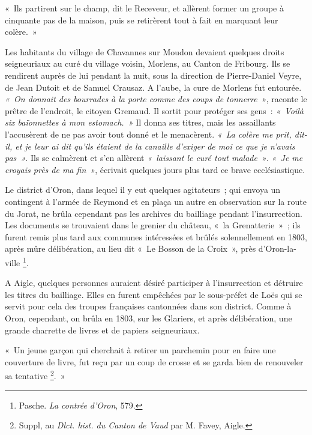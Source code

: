 \documentclass[french,twoside]{book} %
\newenvironment{quoteblock}%
  {\begin{quoting}}
  {\end{quoting}}
\newenvironment{quotebar}{%
    \def\FrameCommand{{\color{rubric!10!}\vrule width 0.5em} \hspace{0.9em}}%
    \def\OuterFrameSep{\itemsep} %
    \MakeFramed {\advance\hsize-\width \FrameRestore}
  }%
  {%
    \endMakeFramed
  }
\renewenvironment{quoteblock}%
  {%
    \savenotes
    \setstretch{0.9}
    \normalfont
    \begin{quotebar}
  }
  {%
    \end{quotebar}
    \spewnotes
  }
\begin{document}
\begin{quoteblock}
\noindent « Ils partirent sur le champ, dit le Receveur, et allèrent former un groupe à cinquante pas de la maison, puis se retirèrent tout à fait en marquant leur colère. »\end{quoteblock}

\noindent Les habitants du village de Chavannes sur Moudon devaient quelques droits seigneuriaux au curé du village voisin, Morlens, au Canton de Fribourg. Ils se rendirent auprès de lui pendant la nuit, sous la direction de Pierre-Daniel Veyre, de Jean Dutoit et de Samuel Crausaz. A l’aube, la cure de Morlens fut entourée. \emph{« On donnait des bourrades à la porte comme des coups de tonnerre »}, raconte le prêtre de l’endroit, le citoyen Gremaud. Il sortit pour protéger ses gens : \emph{« Voilà six baïonnettes à mon estomach. »} Il donna ses titres, mais les assaillants l’accusèrent de ne pas avoir tout donné et le menacèrent. \emph{« La colère me prit\emph{, dit-il}, et je leur ai dit qu’ils étaient de la canaille d’exiger de moi ce que je n’avais pas »}. Ils se calmèrent et s’en allèrent \emph{« laissant le curé tout malade »}. \emph{« Je me croyais près de ma fin »}, écrivait quelques jours plus tard ce brave ecclésiastique.\par
Le district d’Oron, dans lequel il y eut quelques agitateurs ; qui envoya un contingent à l’armée de Reymond et en plaça un autre en observation sur la route du Jorat, ne brûla cependant pas les archives du bailliage pendant l’insurrection. Les documents se trouvaient dans le grenier du château, « la Grenatterie » ; ils furent remis plus tard aux communes intéressées et brûlés solennellement en 1803, après mûre délibération, au lieu dit « Le Bosson de la Croix », près d’Oron-la-ville \footnote{Pasche. \emph{La contrée d’Oron}, 579.}.\par
A Aigle, quelques personnes auraient désiré participer à l’insurrection et détruire les titres du bailliage. Elles en furent empêchées par le sous-préfet de Loës qui se servit pour cela des troupes françaises cantonnées dans son district. Comme à Oron, cependant, on brûla en 1803, sur les Glariers, et après délibération, une grande charrette de livres et de papiers seigneuriaux.\par

\begin{quoteblock}
 \noindent « Un jeune garçon qui cherchait à retirer un parchemin pour en faire une couverture de livre, fut reçu par un coup de crosse et se garda bien de renouveler sa tentative \footnote{Suppl, au \emph{Dlct. hist. du Canton de Vaud} par M. Favey, Aigle.}. »
 \end{quoteblock}
\end{document}
